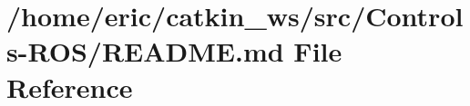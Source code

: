 \hypertarget{Controls-ROS_2README_8md}{}\section{/home/eric/catkin\+\_\+ws/src/\+Controls-\/\+R\+O\+S/\+R\+E\+A\+D\+ME.md File Reference}
\label{Controls-ROS_2README_8md}
